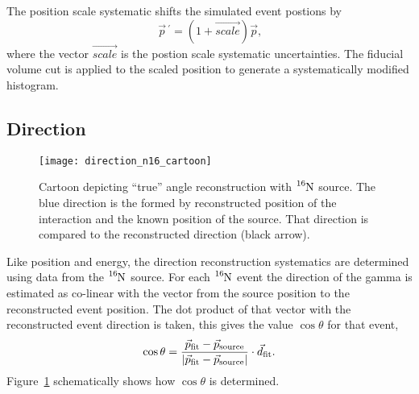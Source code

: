 The position scale systematic shifts the simulated event postions by
\begin{equation}
    \vec{p}\,^{\prime} = (1+\vec{scale})\vec{p}\text{,}
\end{equation}
where the vector $\vec{scale}$ is the postion scale systematic uncertainties.
The fiducial volume cut is applied to the scaled position to generate a
systematically modified histogram.

\subsection{Direction}
\label{sec:angular_systematics}
\begin{figure}[htbp]
    \centering
    \texttt{[image: direction\_n16\_cartoon]}
    \caption[Cartoon of Direction Reconstruction With $\ce{^{16}N}$]{
        Cartoon depicting ``true'' angle reconstruction with $\ce{^{16}N}$
    source. The blue direction is the formed by reconstructed position
of the interaction and the known position of the source. That direction
    is compared to the reconstructed direction (black arrow).}
    \label{fig:n16_direction_cartoon}
\end{figure}
Like position and energy, the direction reconstruction systematics are
determined using data from the $\ce{^{16}N}$ source.
For each $\ce{^{16}N}$ event the direction
of the gamma is estimated as co-linear with the vector from the source
position to the reconstructed event position. The dot product of that vector
with the reconstructed event direction is taken, this gives the value $\cos\theta$
for that event,
\begin{equation}
    \cos\theta = \frac{\vec{p}_{\mathrm{fit}} - \vec{p}_{\mathrm{source}}}
                {\abs{\vec{p}_{\mathrm{fit}} - \vec{p}_{\mathrm{source}}}} \cdot \vec{d}_{\mathrm{fit}}\text{.}
\end{equation}
Figure~\ref{fig:n16_direction_cartoon} schematically shows how $\cos\theta$ is
determined.

